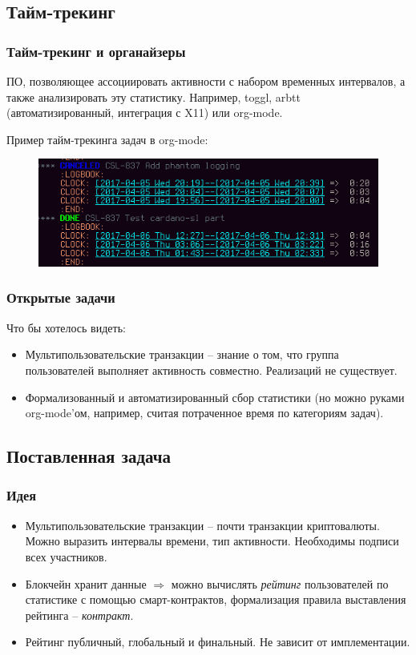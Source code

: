 \documentclass[11pt,handout,pdf,hyperref={unicode}]{beamer}
\begin{document}
\subsection{Тайм-трекинг}

\begin{frame}
  \frametitle{Тайм-трекинг и органайзеры}

  ПО, позволяющее ассоциировать активности с набором временных
  интервалов, а также анализировать эту статистику. Например, toggl,
  arbtt (автоматизированный, интеграция с X11) или org-mode.

  Пример тайм-трекинга задач в org-mode:
  \begin{figure}[t]
  \includegraphics[scale=0.5]{org_mode_task}
  \centering
  \end{figure}
\end{frame}

\begin{frame}
  \frametitle{Открытые задачи}

  Что бы хотелось видеть:
  \begin{itemize}
  \item Мультипользовательские транзакции -- знание о том, что группа
    пользователей выполняет активность совместно. Реализаций не
    существует.
  \item Формализованный и автоматизированный сбор статистики (но можно
    руками org-mode'ом, например, считая потраченное время по
    категориям задач).
  \end{itemize}
\end{frame}

\subsection{Поставленная задача}

\begin{frame}
  \frametitle{Идея}

  \begin{itemize}
  \item Мультипользовательские транзакции -- почти транзакции
    криптовалюты. Можно выразить интервалы времени, тип
    активности. Необходимы подписи всех участников.
  \item Блокчейн хранит данные $\Rightarrow$ можно вычислять
    \textit{рейтинг} пользователей по статистике с помощью
    смарт-контрактов, формализация правила выставления рейтинга --
    \textit{контракт}.
  \item Рейтинг публичный, глобальный и финальный. Не зависит от
    имплементации.
  \end{itemize}
\end{frame}
\end{document}
